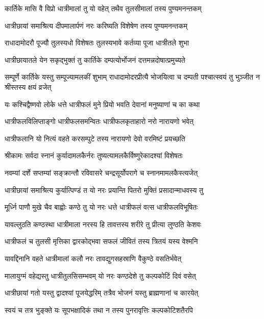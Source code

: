 \twolineshloka
{कार्तिके मासि वै विप्रो धात्रीमालां तु यो वहेत्}
{तथैव तुलसीमालां तस्य पुण्यमनन्तकम्} %

\twolineshloka
{धात्रीछायां समाश्रित्य दीपमालार्पणं नरः}
{करिष्यति विशेषेण तस्य पुण्यमनन्तकम्} %

\twolineshloka
{राधादामोदरौ पूज्यौ तुलस्यधो विशेषतः}
{तुलस्यभावे कर्तव्या पूजा धात्रीतले शुभा} %

\twolineshloka
{धात्रीछायातले येन सकृद्भुक्तं तु कार्तिके}
{दम्पत्योर्भोजनं दत्तमन्नदोषात्प्रमुच्यते} %

\threelineshloka
{सम्पूर्णे कार्तिके यस्तु सम्पूज्यामलकीं शुभाम्}
{राधादामोदरप्रीत्यै भोजयित्वा च दम्पती}
{पश्चात्स्वयं तु भुञ्जीत न श्रीस्तस्य क्षयं व्रजेत्} %

\twolineshloka
{यः कश्चिद्वैष्णवो लोके धत्ते धात्रीफलं मुने}
{प्रियो भवति देवानां मनुष्याणां च का कथा} %

\twolineshloka
{धात्रीफलविलिप्ताङ्गो धात्रीफलसमन्वितः}
{धात्रीफलकृताहारो नरो नारायणो भवेत्} %

\twolineshloka
{धात्रीफलानि यो नित्यं वहते करसम्पुटे}
{तस्य नारायणो देवो वरमिष्टं प्रयच्छति} %

\twolineshloka
{श्रीकामः सर्वदा स्नानं कुर्यादामलकैर्नरः}
{तुष्यत्यामलकैर्विष्णुरेकादश्यां विशेषतः} %

\twolineshloka
{नवम्यां दर्शे सप्तम्यां सङ्क्रान्तौ रविवासरे}
{चन्द्रसूर्योपरागे च स्नानमामलकैस्त्यजेत्} %

\twolineshloka
{धात्रीछायां समाश्रित्य कुर्यात्पिण्डं त यो नरः}
{प्रयान्ति पितरो मुक्तिं प्रसादान्माधवस्य तु} %

\twolineshloka
{मूर्ध्नि पाणौ मुखे चैव बाह्वोः कण्ठे तु यो नरः}
{धत्ते धात्रीफलं वत्स धात्रीफलविभूषितः} %

\twolineshloka
{यावल्लुठति कण्ठस्था धात्रीमाला नरस्य हि}
{तावत्तस्य शरीरे तु प्रीत्या लुण्ठति केशवः} %

\twolineshloka
{धात्रीफलं च तुलसी मृत्तिका द्वारकोद्भवा}
{सफलं जीवितं तस्य त्रितयं यस्य वेश्मनि} %


\twolineshloka
{यावद्दिनानि वहते धात्रीमालां कलौ नरः}
{तावद्युगसहस्राणि वैकुण्ठे वसतिर्भवेत्} %

\twolineshloka
{मालायुग्मं वहेद्यस्तु धात्रीतुलसिसम्भवम्}
{यो नरः कण्ठदेशे तु कल्पकोटिं दिवं वसेत्} %

\twolineshloka
{धात्रीछायां गतो यस्तु द्वादश्यां पूजयेद्धरिम्}
{तत्रैव भोजनं यस्तु ब्राह्मणानां च कारयेत्} %

\twolineshloka
{स्वयं च तत्र भुङ्क्ते यः सूपभक्षादिकं तथा}
{न तस्य पुनरावृत्तिः कल्पकोटिशतैरपि} %


